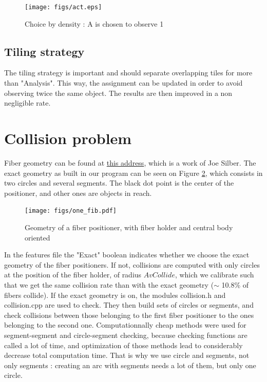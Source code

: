 \documentclass{article}
\begin{document}
\begin{figure}[H]\begin{center}
	\texttt{[image: figs/act.eps]}
	\caption{Choice by density : A is chosen to observe 1}\label{act}
\end{center}\end{figure}

\subsection{Tiling strategy}
The tiling strategy is important and should separate overlapping tiles for more than "Analysis". This way, the assignment can be updated in order to avoid observing twice the same object. The results are then improved in a non negligible rate.


\section{Collision problem}
Fiber geometry can be found at \href{https://desi.lbl.gov/DocDB/cgi-bin/private/ShowDocument?docid=899}{this address}, which is a work of Joe Silber. The exact geometry as built in our program can be seen on Figure \ref{onefib}, which consists in two circles and several segments. The black dot point is the center of the positioner, and other ones are objects in reach.

\begin{figure}[H]\begin{center}
	\texttt{[image: figs/one\_fib.pdf]}
	\caption{Geometry of a fiber positioner, with fiber holder and central body oriented}\label{onefib}
\end{center}\end{figure}

In the features file the "Exact" boolean indicates whether we choose the exact geometry of the fiber positioners. If not, collisions are computed with only circles at the position of the fiber holder, of radius $AvCollide$, which we calibrate such that we get the same collision rate than with the exact geometry ($\sim$ 10.8\% of fibers collide). If the exact geometry is on, the modules collision.h and collision.cpp are used to check. They then build sets of circles or segments, and check collisions between those belonging to the first fiber positioner to the ones belonging to the second one.
Computationnally cheap methods were used for segment-segment and circle-segment checking, because checking functions are called a lot of time, and optimization of those methods lead to considerably decrease total computation time. That is why we use circle and segments, not only segments : creating an arc with segments needs a lot of them, but only one circle.
\end{document}
